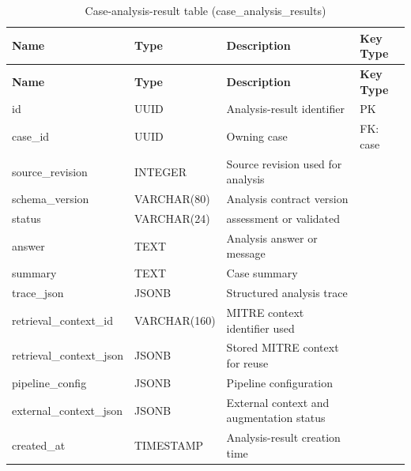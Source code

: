 \begin{longtable}{@{}>{\raggedright\arraybackslash}p{} >{\raggedright\arraybackslash}p{} >{\raggedright\arraybackslash}p{} >{\raggedright\arraybackslash}p{}@{}}
\caption{Case-analysis-result table (case\_analysis\_results)}\label{tab:3-15}\\
\toprule
\textbf{Name} & \textbf{Type} & \textbf{Description} & \textbf{Key Type} \\
\midrule
\endfirsthead
\textbf{Name} & \textbf{Type} & \textbf{Description} & \textbf{Key Type} \\
\midrule
\endhead
id & UUID & Analysis-result identifier & PK \\
case\_id & UUID & Owning case & FK: case \\
source\_revision & INTEGER & Source revision used for analysis &  \\
schema\_version & VARCHAR(80) & Analysis contract version &  \\
status & VARCHAR(24) & assessment or validated &  \\
answer & TEXT & Analysis answer or message &  \\
summary & TEXT & Case summary &  \\
trace\_json & JSONB & Structured analysis trace &  \\
retrieval\_context\_id & VARCHAR(160) & MITRE context identifier used &  \\
retrieval\_context\_json & JSONB & Stored MITRE context for reuse &  \\
pipeline\_config & JSONB & Pipeline configuration &  \\
external\_context\_json & JSONB & External context and augmentation status &  \\
created\_at & TIMESTAMP & Analysis-result creation time &  \\
\bottomrule
\end{longtable}

